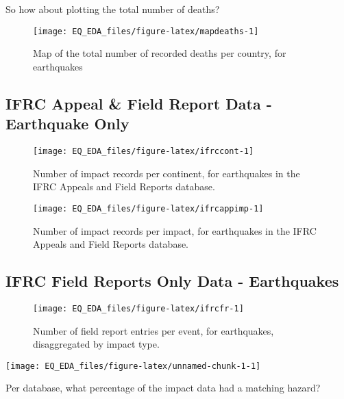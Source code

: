 \documentclass[
]{article}
\begin{document}
So how about plotting the total number of deaths?

\begin{figure}
\texttt{[image: EQ\_EDA\_files/figure-latex/mapdeaths-1]} \caption[Map of the total number of recorded deaths per country, for earthquakes]{Map of the total number of recorded deaths per country, for earthquakes}\label{fig:mapdeaths}
\end{figure}

\hypertarget{ifrc-appeal-field-report-data---earthquake-only}{%
\subsection{IFRC Appeal \& Field Report Data - Earthquake Only}\label{ifrc-appeal-field-report-data---earthquake-only}}

\begin{figure}
\texttt{[image: EQ\_EDA\_files/figure-latex/ifrccont-1]} \caption[Number of impact records per continent, for earthquakes in the IFRC Appeals and Field Reports database]{Number of impact records per continent, for earthquakes in the IFRC Appeals and Field Reports database.}\label{fig:ifrccont}
\end{figure}

\begin{figure}
\texttt{[image: EQ\_EDA\_files/figure-latex/ifrcappimp-1]} \caption[Number of impact records per impact, for earthquakes in the IFRC Appeals and Field Reports database]{Number of impact records per impact, for earthquakes in the IFRC Appeals and Field Reports database.}\label{fig:ifrcappimp}
\end{figure}

\hypertarget{ifrc-field-reports-only-data---earthquakes}{%
\subsection{IFRC Field Reports Only Data - Earthquakes}\label{ifrc-field-reports-only-data---earthquakes}}

\begin{figure}
\texttt{[image: EQ\_EDA\_files/figure-latex/ifrcfr-1]} \caption[Number of field report entries per event, for earthquakes, disaggregated by impact type]{Number of field report entries per event, for earthquakes, disaggregated by impact type.}\label{fig:ifrcfr}
\end{figure}

\texttt{[image: EQ\_EDA\_files/figure-latex/unnamed-chunk-1-1]}

Per database, what percentage of the impact data had a matching hazard?
\end{document}
